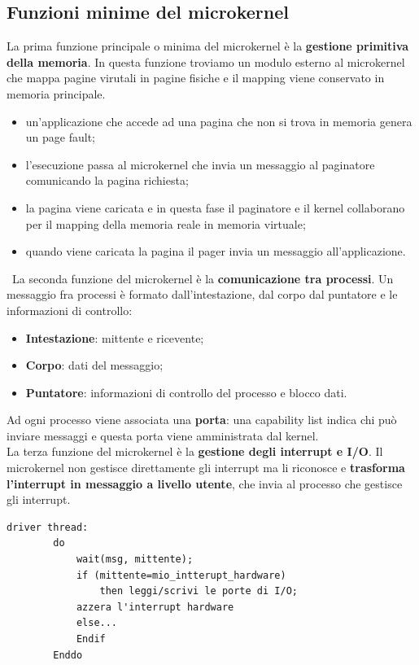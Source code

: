 \documentclass[12pt, letterpaper]{report}
\begin{document}
	\subsection{Funzioni minime del microkernel}
	La prima funzione principale o minima del microkernel è la \textbf{gestione primitiva della memoria}. In questa funzione troviamo un modulo esterno al microkernel che mappa pagine virutali in pagine fisiche e il mapping viene conservato in memoria principale.
	\begin{itemize}
		\item un'applicazione che accede ad una pagina che non si trova in memoria genera un page fault;
		\item l'esecuzione passa al microkernel che invia un messaggio al paginatore comunicando la pagina richiesta;
		\item la pagina viene caricata e in questa fase il paginatore e il kernel collaborano per il mapping della memoria reale in memoria virtuale;
		\item quando viene caricata la pagina il pager invia un messaggio all'applicazione.
	\end{itemize}\
	La seconda funzione del microkernel è la \textbf{comunicazione tra processi}. Un messaggio fra processi è formato dall'intestazione, dal corpo dal puntatore e le informazioni di controllo:
	\begin{itemize}
		\item \textbf{Intestazione}: mittente e ricevente;
		\item \textbf{Corpo}: dati del messaggio;
		\item \textbf{Puntatore}: informazioni di controllo del processo e blocco dati.
	\end{itemize}
	Ad ogni processo viene associata una \textbf{porta}: una capability list indica chi può inviare messaggi e questa porta viene amministrata dal kernel.\\
	La terza funzione del microkernel è la \textbf{gestione degli interrupt e I/O}. Il microkernel non gestisce direttamente gli interrupt ma li riconosce e \textbf{trasforma l'interrupt in messaggio a livello utente}, che invia al processo che gestisce gli interrupt.
	\begin{lstlisting}[style=pascalstyle]
		driver thread:
		do
			wait(msg, mittente);
			if (mittente=mio_intterupt_hardware)
				then leggi/scrivi le porte di I/O;
			azzera l'interrupt hardware
			else...
			Endif
		Enddo
	\end{lstlisting}
\end{document}
